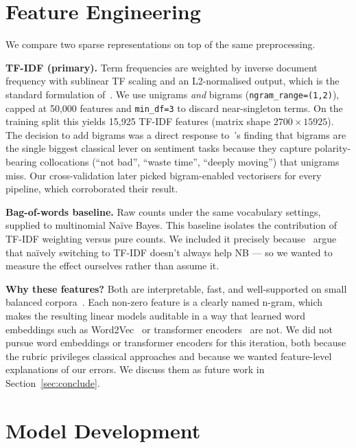 \documentclass[11pt]{article}
\begin{document}
\section{Feature Engineering}
\label{sec:features}

We compare two sparse representations on top of the same preprocessing.

\textbf{TF-IDF (primary).} Term frequencies are weighted by inverse document frequency with sublinear TF scaling and an L2-normalised output, which is the standard formulation of~\citet{salton_buckley_1988}. We use unigrams \emph{and} bigrams (\texttt{ngram\_range=(1,2)}), capped at 50{,}000 features and \texttt{min\_df=3} to discard near-singleton terms. On the training split this yields 15{,}925 TF-IDF features (matrix shape $2700 \times 15925$). The decision to add bigrams was a direct response to~\citet{wang_manning_2012}'s finding that bigrams are the single biggest classical lever on sentiment tasks because they capture polarity-bearing collocations (``not bad'', ``waste time'', ``deeply moving'') that unigrams miss. Our cross-validation later picked bigram-enabled vectorisers for every pipeline, which corroborated their result.

\textbf{Bag-of-words baseline.} Raw counts under the same vocabulary settings, supplied to multinomial Na\"ive Bayes. This baseline isolates the contribution of TF-IDF weighting versus pure counts. We included it precisely because~\citet{wang_manning_2012} argue that na\"ively switching to TF-IDF doesn't always help NB --- so we wanted to measure the effect ourselves rather than assume it.

\textbf{Why these features?} Both are interpretable, fast, and well-supported on small balanced corpora~\citep{joachims_1998, mccallum_nigam_1998}. Each non-zero feature is a clearly named n-gram, which makes the resulting linear models auditable in a way that learned word embeddings such as Word2Vec~\citep{mikolov_2013} or transformer encoders~\citep{devlin_bert_2019} are not. We did not pursue word embeddings or transformer encoders for this iteration, both because the rubric privileges classical approaches and because we wanted feature-level explanations of our errors. We discuss them as future work in Section~\ref{sec:conclude}.

\section{Model Development}
\label{sec:models}
\end{document}
